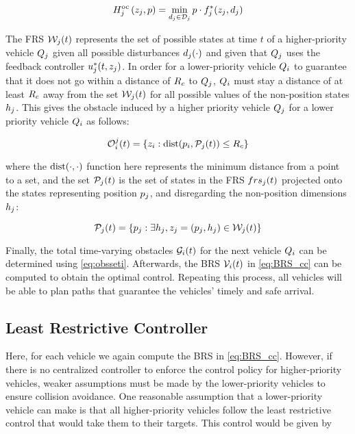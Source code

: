 \begin{equation}
H^\text{oc}_j\left(z_j, p\right) = \min_{d_j \in \mathcal{D}_j} p \cdot f^*_j(z_j, d_j)
\end{equation}

The FRS $\mathcal{W}_j(t)$ represents the set of possible states at time $t$ of a higher-priority vehicle $Q_{j}$ given all possible disturbances $d_j(\cdot)$ and given that $Q_{j}$ uses the feedback controller $u_j^*(t, z_j)$. In order for a lower-priority vehicle $Q_{i}$ to guarantee that it does not go within a distance of $R_c$ to $Q_{j}$, $Q_{i}$ must stay a distance of at least $R_c$ away from the set $\mathcal{W}_j(t)$ for all possible values of the non-position states $h_j$. This gives the obstacle induced by a higher priority vehicle $Q_{j}$ for a lower priority vehicle $Q_{i}$ as follows:

\begin{equation}
\mathcal{O}_i^j(t) = \{z_i: \text{dist}(p_i, \mathcal{P}_j(t)) \le R_c \}
\end{equation}

\noindent where the $\text{dist}(\cdot, \cdot)$ function here represents the minimum distance from a point to a set, and the set $\mathcal{P}_j(t)$ is the set of states in the FRS $\\frs_j(t)$ projected onto the states representing position $p_j$, and disregarding the non-position dimensions $h_j$:

\begin{equation}
\mathcal{P}_j(t) = \{p_j: \exists h_j, z_j = (p_j, h_j) \in \mathcal{W}_j(t)\}
\end{equation}

Finally, the total time-varying obstacles $\mathcal{G}_i(t)$ for the next vehicle $Q_{i}$ can be determined using \eqref{eq:obsseti}. Afterwards, the BRS $\mathcal{V}_i(t)$ in \eqref{eq:BRS_cc} can be computed to obtain the optimal control. Repeating this process, all vehicles will be able to plan paths that guarantee the vehicles' timely and safe arrival.

\subsection{Least Restrictive Controller}
\label{sec:incomp_LRctrl}
Here, for each vehicle we again compute the BRS in \eqref{eq:BRS_cc}. However, if there is no centralized controller to enforce the control policy for higher-priority vehicles, weaker assumptions must be made by the lower-priority vehicles to ensure collision avoidance. One reasonable assumption that a lower-priority vehicle can make is that all higher-priority vehicles follow the least restrictive control that would take them to their targets. This control would be given by 

